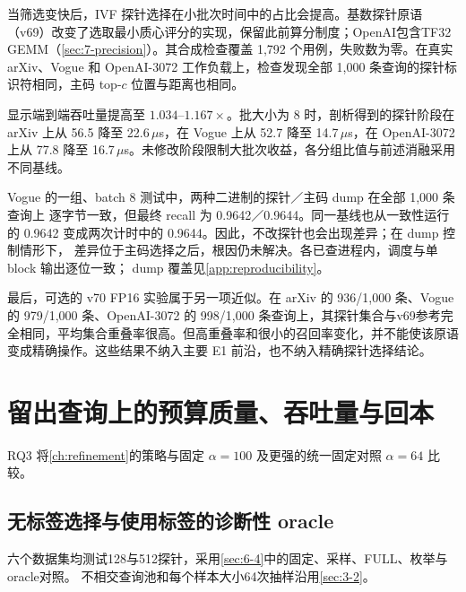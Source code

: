 当筛选变快后，IVF 探针选择在小批次时间中的占比会提高。基数探针原语（v69）改变了选取最小质心评分的实现，保留此前算分制度；OpenAI包含TF32 GEMM（\cref{sec:7-precision}）。其合成检查覆盖 1,792 个用例，失败数为零。在真实 arXiv、Vogue 和 OpenAI-3072 工作负载上，检查发现全部 1,000 条查询的探针标识符相同，主码 top-$c$ 位置与距离也相同。

\begin{table}[tbp]
\centering
\caption[探针选择吞吐量比]{已算分数的精确探针选择改动的 v69/v65 端到端吞吐量比。每个工作负载—批大小比较中，每个二进制程序共计时十轮，采用交替运行。大于一表示 v69 更快。}
\label{tab:7-probe}
\small

\end{table}

 显示端到端吞吐量提高至 $1.034$--$1.167\times$。批大小为 8 时，剖析得到的探针阶段在 arXiv 上从 56.5 降至 22.6\,$\mu$s，在 Vogue 上从 52.7 降至 14.7\,$\mu$s，在 OpenAI-3072 上从 77.8 降至 16.7\,$\mu$s。未修改阶段限制大批次收益，各分组比值与前述消融采用不同基线。

Vogue 的一组、batch 8 测试中，两种二进制的探针／主码 dump 在全部 1,000 条查询上
逐字节一致，但最终 recall 为 0.9642／0.9644。同一基线也从一致性运行的 0.9642
变成两次计时中的 0.9644。因此，不改探针也会出现差异；在 dump 控制情形下，
差异位于主码选择之后，根因仍未解决。各已查进程内，调度与单 block 输出逐位一致；
dump 覆盖见\cref{app:reproducibility}。

最后，可选的 v70 FP16 实验属于另一项近似。在 arXiv 的 936/1,000 条、Vogue 的 979/1,000 条、OpenAI-3072 的 998/1,000 条查询上，其探针集合与v69参考完全相同，平均集合重叠率很高。但高重叠率和很小的召回率变化，并不能使该原语变成精确操作。这些结果不纳入主要 E1 前沿，也不纳入精确探针选择结论。

\section{留出查询上的预算质量、吞吐量与回本}
\label{sec:7-5}

RQ3 将\cref{ch:refinement}的策略与固定 $\alpha=100$ 及更强的统一固定对照 $\alpha=64$ 比较。

\subsection{无标签选择与使用标签的诊断性 oracle}

六个数据集均测试128与512探针，采用\cref{sec:6-4}中的固定、采样、FULL、枚举与oracle对照。
不相交查询池和每个样本大小64次抽样沿用\cref{sec:3-2}。


